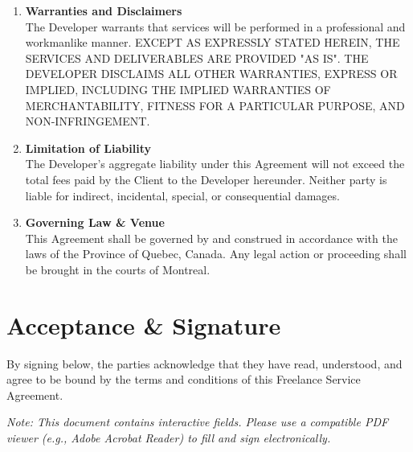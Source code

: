 \documentclass[11pt, a4paper]{article}
\begin{document}
\begin{enumerate}[label=\textbf{4.\arabic*}, leftmargin=*, wide, labelwidth=!, labelindent=0pt]
    \item \textbf{Warranties and Disclaimers} \\
    The Developer warrants that services will be performed in a professional and workmanlike manner. EXCEPT AS EXPRESSLY STATED HEREIN, THE SERVICES AND DELIVERABLES ARE PROVIDED "AS IS". THE DEVELOPER DISCLAIMS ALL OTHER WARRANTIES, EXPRESS OR IMPLIED, INCLUDING THE IMPLIED WARRANTIES OF MERCHANTABILITY, FITNESS FOR A PARTICULAR PURPOSE, AND NON-INFRINGEMENT.

    \item \textbf{Limitation of Liability} \\
    The Developer's aggregate liability under this Agreement will not exceed the total fees paid by the Client to the Developer hereunder. Neither party is liable for indirect, incidental, special, or consequential damages.

    \item \textbf{Governing Law \& Venue} \\
    This Agreement shall be governed by and construed in accordance with the laws of the Province of Quebec, Canada. Any legal action or proceeding shall be brought in the courts of Montreal.

\end{enumerate}


\section*{Acceptance \& Signature}
By signing below, the parties acknowledge that they have read, understood, and agree to be bound by the terms and conditions of this Freelance Service Agreement.

\bigskip
\textit{Note: This document contains interactive fields. Please use a compatible PDF viewer (e.g., Adobe Acrobat Reader) to fill and sign electronically.}
\bigskip
\end{document}
